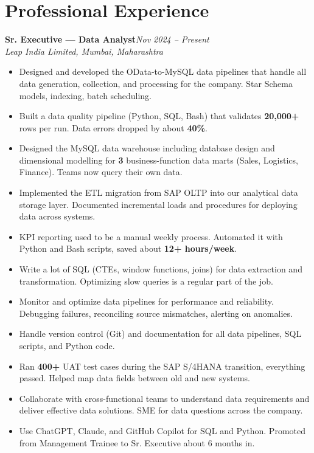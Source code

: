 \documentclass[10pt, letterpaper]{article}
\newcommand{\role}[3]{%
  \vspace{2pt}%
  {\bfseries #1}\hfill{\small\color{muted}\textit{#3}}\\[-2pt]%
  {\small\color{muted}\textit{#2}}%
}
\begin{document}
\section{Professional Experience}

\role{Sr. Executive --- Data Analyst}{Leap India Limited, Mumbai, Maharashtra}{Nov 2024 -- Present}

\begin{itemize}
  \item Designed and developed the OData-to-MySQL data pipelines that handle all data generation, collection, and processing for the company. Star Schema models, indexing, batch scheduling.
  \item Built a data quality pipeline (Python, SQL, Bash) that validates \textbf{20,000+} rows per run. Data errors dropped by about \textbf{40\%}.
  \item Designed the MySQL data warehouse including database design and dimensional modelling for \textbf{3} business-function data marts (Sales, Logistics, Finance). Teams now query their own data.
  \item Implemented the ETL migration from SAP OLTP into our analytical data storage layer. Documented incremental loads and procedures for deploying data across systems.
  \item KPI reporting used to be a manual weekly process. Automated it with Python and Bash scripts, saved about \textbf{12+ hours/week}.
  \item Write a lot of SQL (CTEs, window functions, joins) for data extraction and transformation. Optimizing slow queries is a regular part of the job.
  \item Monitor and optimize data pipelines for performance and reliability. Debugging failures, reconciling source mismatches, alerting on anomalies.
  \item Handle version control (Git) and documentation for all data pipelines, SQL scripts, and Python code.
  \item Ran \textbf{400+} UAT test cases during the SAP S/4HANA transition, everything passed. Helped map data fields between old and new systems.
  \item Collaborate with cross-functional teams to understand data requirements and deliver effective data solutions. SME for data questions across the company.
  \item Use ChatGPT, Claude, and GitHub Copilot for SQL and Python. Promoted from Management Trainee to Sr. Executive about 6 months in.
\end{itemize}
\end{document}
